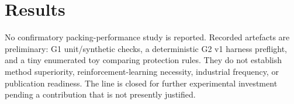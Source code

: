 \section{Results}

No confirmatory packing-performance study is reported. Recorded artefacts are
preliminary: G1 unit/synthetic checks, a deterministic G2 v1 harness preflight,
and a tiny enumerated toy comparing protection rules. They do not establish
method superiority, reinforcement-learning necessity, industrial frequency, or
publication readiness. The line is closed for further experimental investment
pending a contribution that is not presently justified.
